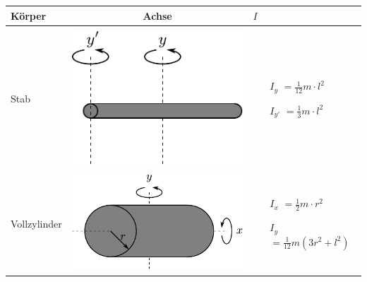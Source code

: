 \newpage
\begin{table}[h!]
\centering
\begin{tabular}{m{2cm} c m{}}
Körper        & Achse        & $I$ \\
\hline
& & \\
Stab &
        \begin{minipage}{0.3\textwidth}
        \centering
        \includegraphics[scale=\traegscale]{traeg/traeg-stab.pdf}
        \end{minipage} &
                \begin{itemize}
                \item[$I_y$]$= \frac{1}{12} m \cdot l^2$
                \item[$I_{y'}$]$= \frac{1}{3} m \cdot l^2$
                \end{itemize} \\
& & \\
Vollzylinder &
        \begin{minipage}{0.3\textwidth}
        \centering
        \includegraphics[scale=\traegscale]{traeg/traeg-vollzylinder.pdf}
        \end{minipage} &
                \begin{itemize}
                \item[$I_x$]$= \frac12 m \cdot r^2$
                \item[$I_y$]$= \frac{1}{12} m \left( 3r^2 + l^2 \right)$

\end{itemize}
\end{tabular}
\end{table}
